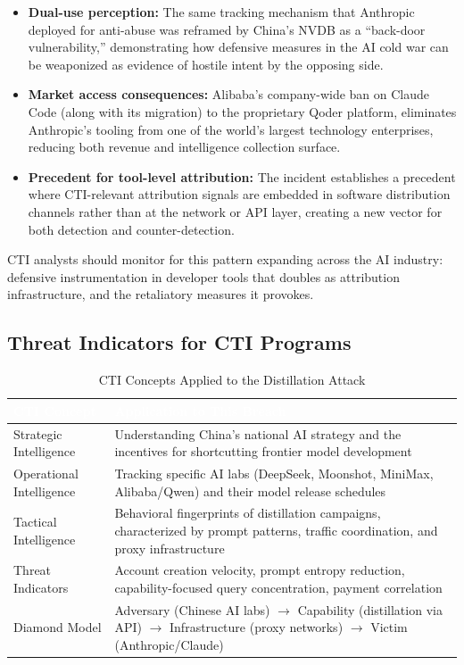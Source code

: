 \documentclass[11pt,a4paper]{article}
\begin{document}
\begin{itemize}[leftmargin=20pt, noitemsep]
    \item \textbf{Dual-use perception:} The same tracking mechanism that Anthropic deployed for anti-abuse was reframed by China's NVDB as a ``back-door vulnerability,'' demonstrating how defensive measures in the AI cold war can be weaponized as evidence of hostile intent by the opposing side.
    \item \textbf{Market access consequences:} Alibaba's company-wide ban on Claude Code (along with its migration) to the proprietary Qoder platform, eliminates Anthropic's tooling from one of the world's largest technology enterprises, reducing both revenue and intelligence collection surface.
    \item \textbf{Precedent for tool-level attribution:} The incident establishes a precedent where CTI-relevant attribution signals are embedded in software distribution channels rather than at the network or API layer, creating a new vector for both detection and counter-detection.
\end{itemize}

CTI analysts should monitor for this pattern expanding across the AI industry: defensive instrumentation in developer tools that doubles as attribution infrastructure, and the retaliatory measures it provokes.

\subsection{Threat Indicators for CTI Programs}

\begin{table}[H]
\centering
\renewcommand{\arraystretch}{1.3}
\begin{tabularx}{\textwidth}{|L{4cm}|X|}
\hline
{}
\textcolor{white}{\textbf{CTI Concept}} & \textcolor{white}{\textbf{Application to This Breach}} \\
\hline
Strategic Intelligence & Understanding China's national AI strategy and the incentives for shortcutting frontier model development \\
Operational Intelligence & Tracking specific AI labs (DeepSeek, Moonshot, MiniMax, Alibaba/Qwen) and their model release schedules \\
Tactical Intelligence & Behavioral fingerprints of distillation campaigns, characterized by prompt patterns, traffic coordination, and proxy infrastructure \\
Threat Indicators & Account creation velocity, prompt entropy reduction, capability-focused query concentration, payment correlation \\
Diamond Model & Adversary (Chinese AI labs) $\rightarrow$ Capability (distillation via API) $\rightarrow$ Infrastructure (proxy networks) $\rightarrow$ Victim (Anthropic/Claude) \\
\hline
\end{tabularx}
\caption{CTI Concepts Applied to the Distillation Attack}
\label{tab:cti_concepts}
\end{table}
\end{document}
